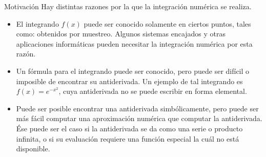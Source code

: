 \documentclass[12pt]{beamer}
\begin{document}
\begin{frame}{Motivaci\'on}
    Hay distintas razones por la que la integraci\'on num\'erica se realiza.
    \begin{itemize}
    \item<2-> El integrando $f(x)$ puede ser conocido solamente en ciertos puntos, tales como: obtenidos por muestreo. Algunos sistemas encajados y otras aplicaciones inform\'aticas pueden necesitar la integraci\'on num\'erica por esta raz\'on.    
    \item<3-> Un f\'ormula para el integrando puede ser conocido, pero puede ser dif\'icil o imposible de encontrar su antiderivada. Un ejemplo de tal integrando es $f(x) = e^{-x^2}$, cuya antiderivada no se puede escribir en forma elemental.    
    \item<4-> Puede ser posible encontrar una antiderivada simb\'olicamente, pero puede ser m\'as f\'acil computar una aproximaci\'on num\'erica que computar la antiderivada. \'Ese puede ser el caso si la antiderivada se da como una serie o producto infinita, o si su evaluaci\'on requiere una funci\'on especial la cu\'al no est\'a disponible.
  \end{itemize}
\end{frame}
\end{document}
